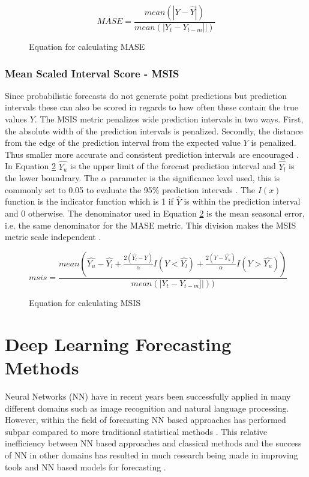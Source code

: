 \begin{figure}[h]
  \[MASE = \frac{mean(|Y - \hat{Y}|)}{mean(|Y_t - Y_{t-m}]|)}\]
  \caption{Equation for calculating MASE}
  \label{eq:MASE}
\end{figure}

\subsubsection{Mean Scaled Interval Score - MSIS}
\label{sec:msis}
Since probabilistic forecasts do not generate point predictions but prediction intervals these can also be scored in regards to how often these contain the true values \(Y\). The MSIS metric penalizes wide prediction intervals in two ways. First, the absolute width of the prediction intervals is penalized. Secondly, the distance from the edge of the prediction interval from the expected value \(Y\) is penalized. Thus smaller more accurate and consistent prediction intervals are encouraged \cite{makridakis_m4_2020}. In Equation \ref{eq:MSIS} \(\hat{Y_u}\) is the upper limit of the forecast prediction interval and \(\hat{Y_l}\) is the lower boundrary. The \(\alpha\) parameter is the significance level used, this is commonly set to 0.05 to evaluate the 95\% prediction intervals \cite{makridakis_m4_2020,gluonts-github}. The \(I(x)\) function is the indicator function which is 1 if \(\hat{Y}\) is within the prediction interval and 0 otherwise. The denominator used in Equation \ref{eq:MSIS} is the mean seasonal error, i.e. the same denominator for the MASE metric. This division makes the MSIS metric scale independent \cite{gluonts-github,makridakis_m4_2020}.

\begin{figure}[h]
  \[msis = \frac{mean(\hat{Y_u} - \hat{Y_l} + \frac{2(\hat{Y_l}-Y)}{\alpha}I(Y<\hat{Y_l}) + \frac{2(Y-\hat{Y_u})}{\alpha}I(Y>\hat{Y_u}))}{mean(|Y_t - Y_{t-m}]|))}\]
  \caption{Equation for calculating MSIS}
  \label{eq:MSIS}
\end{figure}

\section{Deep Learning Forecasting Methods}
\label{sec:deep_learning_methods}
Neural Networks (NN) have in recent years been successfully applied in many different domains such as image recognition and natural language processing. However, within the field of forecasting NN based approaches has performed subpar compared to more traditional statistical methods \cite{m3_competition,makridakis_m4_2020,oreshkin_n_beats_2020, other_thesis}. This relative inefficiency between NN based approaches and classical methods and the success of NN in other domains has resulted in much research being made in improving tools and NN based models for forecasting \cite{gluonts_paper}.

